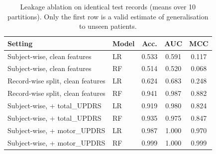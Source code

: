 \begin{table}[!t]\centering\caption{Leakage ablation on identical test records (means over 10 partitions). Only the first row is a valid estimate of generalisation to unseen patients.}\label{tab:leak}\scriptsize\setlength{\tabcolsep}{3pt}\begin{tabular}{llccc}\toprule Setting & Model & Acc. & AUC & MCC\\\midrule
Subject-wise, clean features & LR & 0.533 & 0.591 & 0.117\\
Subject-wise, clean features & RF & 0.514 & 0.520 & 0.068\\
Record-wise split, clean features & LR & 0.624 & 0.683 & 0.248\\
Record-wise split, clean features & RF & 0.941 & 0.987 & 0.882\\
Subject-wise, + total\_UPDRS & LR & 0.919 & 0.980 & 0.824\\
Subject-wise, + total\_UPDRS & RF & 0.935 & 0.975 & 0.847\\
Subject-wise, + motor\_UPDRS & LR & 0.987 & 1.000 & 0.970\\
Subject-wise, + motor\_UPDRS & RF & 0.999 & 1.000 & 0.999\\
\bottomrule\end{tabular}\end{table}
